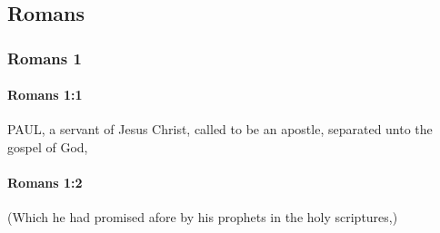 \subsection{Romans}
	\label{ROMANS}
			
	\subsubsection{Romans 1} %
		\label{ROMANS-1} 
		
		\paragraph{Romans 1:1} %
			\label{ROMANS-1-1}

			PAUL, a servant of Jesus Christ, called to be an apostle, separated unto the gospel of God,

			\begin{framed}
			\scriptsize
				\begin{compactdesc}
					\item[SBLG] 
				\end{compactdesc}
			\end{framed}

		\paragraph{Romans 1:2} %
			\label{ROMANS-1-2}

			(Which he had promised afore by his prophets in the holy scriptures,)

